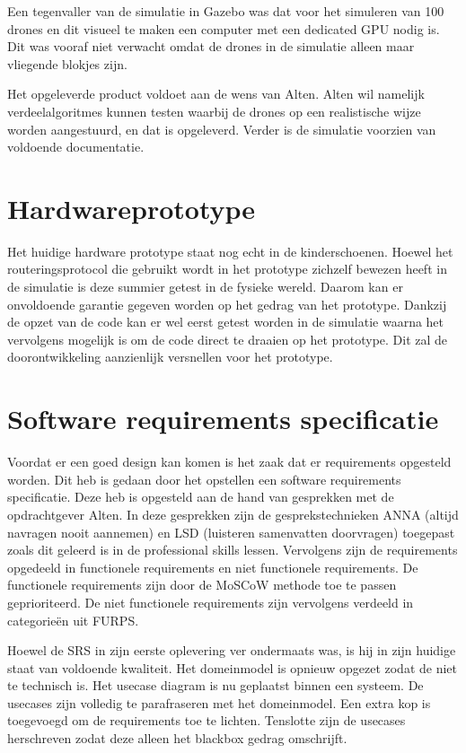 \documentclass[a4paper, 11pt, oneside]{report}
\begin{document}
Een tegenvaller van de simulatie in Gazebo was dat voor het simuleren van 100 drones en dit visueel te maken een computer met een dedicated GPU nodig is. Dit was vooraf niet verwacht omdat de drones in de simulatie alleen maar vliegende blokjes zijn. 

Het opgeleverde product voldoet aan de wens van Alten. Alten wil namelijk verdeelalgoritmes kunnen testen waarbij de drones op een realistische wijze worden aangestuurd, en dat is opgeleverd.  Verder is de simulatie voorzien van voldoende documentatie.  

\section{Hardwareprototype}\label{sec:hardwareprototype}
Het huidige hardware prototype staat nog echt in de kinderschoenen.
Hoewel het routeringsprotocol die gebruikt wordt in het prototype zichzelf bewezen heeft in de simulatie is deze summier getest in de fysieke wereld.
Daarom kan er onvoldoende garantie gegeven worden op het gedrag van het prototype.
Dankzij de opzet van de code kan er wel eerst getest worden in de simulatie waarna het vervolgens mogelijk is om de code direct te draaien op het prototype.
Dit zal de doorontwikkeling aanzienlijk versnellen voor het prototype.



\section{Software requirements specificatie}\label{sec:software-requirements-specificatie}
Voordat er een goed design kan komen is het zaak dat er requirements opgesteld worden.
Dit heb is gedaan door het opstellen een software requirements specificatie.  
Deze heb is opgesteld aan de hand van gesprekken met de opdrachtgever Alten.
In deze gesprekken zijn de gesprekstechnieken ANNA (altijd navragen nooit aannemen) en LSD (luisteren samenvatten doorvragen) toegepast zoals dit geleerd is in de professional skills lessen.  
Vervolgens zijn de requirements opgedeeld in functionele requirements en niet functionele requirements. 
De functionele requirements zijn door de MoSCoW methode toe te passen geprioriteerd.
De niet functionele requirements zijn vervolgens verdeeld in categorieën uit FURPS. 

Hoewel de SRS in zijn eerste oplevering ver ondermaats was, is hij in zijn huidige staat van voldoende kwaliteit.
Het domeinmodel is opnieuw opgezet zodat de niet te technisch is.
Het usecase diagram is nu geplaatst binnen een systeem.
De usecases zijn volledig te parafraseren met het domeinmodel.
Een extra kop is toegevoegd om de requirements toe te lichten.
Tenslotte zijn de usecases herschreven zodat deze alleen het blackbox gedrag omschrijft.
\end{document}
